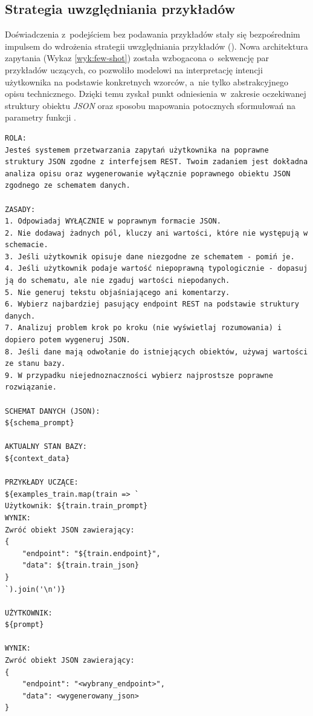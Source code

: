 \subsection{Strategia uwzględniania przykładów}

Doświadczenia z~podejściem bez podawania przykładów stały się bezpośrednim impulsem do wdrożenia strategii uwzględniania przykładów (). Nowa architektura zapytania (Wykaz \ref{wyk:few-shot}) została wzbogacona o~sekwencję par przykładów uczących, co pozwoliło modelowi na interpretację intencji użytkownika na podstawie konkretnych wzorców, a~nie tylko abstrakcyjnego opisu technicznego. Dzięki temu  zyskał punkt odniesienia w~zakresie oczekiwanej struktury obiektu \textit{JSON} oraz sposobu mapowania potocznych sformułowań na parametry funkcji .

\begin{lstlisting}[caption={Struktura zapytania zawierająca pełny schemat bazy danych i przykłady uczące.}, label={wyk:few-shot}]
ROLA:
Jesteś systemem przetwarzania zapytań użytkownika na poprawne struktury JSON zgodne z interfejsem REST. Twoim zadaniem jest dokładna analiza opisu oraz wygenerowanie wyłącznie poprawnego obiektu JSON zgodnego ze schematem danych.

ZASADY:
1. Odpowiadaj WYŁĄCZNIE w poprawnym formacie JSON.
2. Nie dodawaj żadnych pól, kluczy ani wartości, które nie występują w schemacie.
3. Jeśli użytkownik opisuje dane niezgodne ze schematem - pomiń je.
4. Jeśli użytkownik podaje wartość niepoprawną typologicznie - dopasuj ją do schematu, ale nie zgaduj wartości niepodanych.
5. Nie generuj tekstu objaśniającego ani komentarzy.
6. Wybierz najbardziej pasujący endpoint REST na podstawie struktury danych.
7. Analizuj problem krok po kroku (nie wyświetlaj rozumowania) i dopiero potem wygeneruj JSON.
8. Jeśli dane mają odwołanie do istniejących obiektów, używaj wartości ze stanu bazy.
9. W przypadku niejednoznaczności wybierz najprostsze poprawne rozwiązanie.

SCHEMAT DANYCH (JSON):
${schema_prompt}

AKTUALNY STAN BAZY:
${context_data}

PRZYKŁADY UCZĄCE:
${examples_train.map(train => `
Użytkownik: ${train.train_prompt}
WYNIK:
Zwróć obiekt JSON zawierający:
{
    "endpoint": "${train.endpoint}",
    "data": ${train.train_json}
}
`).join('\n')}

UŻYTKOWNIK:
${prompt}

WYNIK:
Zwróć obiekt JSON zawierający:
{
    "endpoint": "<wybrany_endpoint>",
    "data": <wygenerowany_json>
}
\end{lstlisting}

